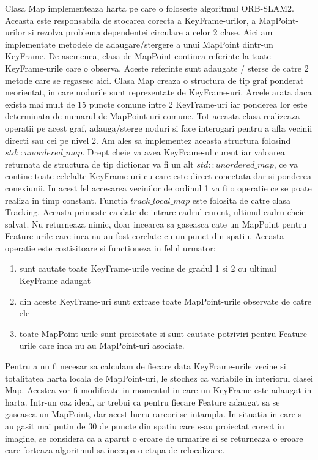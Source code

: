 \documentclass[12pt,a4paper]{report}
\begin{document}
Clasa Map implementeaza harta pe care o foloseste algoritmul ORB-SLAM2. Aceasta este responsabila
de stocarea corecta a KeyFrame-urilor, a MapPoint-urilor si rezolva problema dependentei circulare
a celor 2 clase. Aici am implementate metodele de adaugare/stergere a unui MapPoint dintr-un KeyFrame.
De asemenea, clasa de MapPoint continea referinte la toate KeyFrame-urile care o observa. Aceste 
referinte sunt adaugate / sterse de catre 2 metode care se regasesc aici. Clasa Map creaza o 
structura de tip graf ponderat neorientat, in care nodurile sunt reprezentate de KeyFrame-uri. 
Arcele arata daca exista mai mult de 15 puncte comune intre 2 KeyFrame-uri iar ponderea lor este 
determinata de numarul de MapPoint-uri comune. Tot aceasta clasa realizeaza operatii pe acest graf,
adauga/sterge noduri si face interogari pentru a afla vecinii directi sau cei pe nivel 2. Am ales 
sa implementez aceasta structura folosind $ std::unordered\_map $. Drept cheie va avea KeyFrame-ul 
curent iar valoarea returnata de structura de tip dictionar va fi un alt $ std::unordered\_map $, 
ce va contine toate celelalte KeyFrame-uri cu care este direct conectata dar si ponderea conexiunii.
In acest fel accesarea vecinilor de ordinul 1 va fi o operatie ce se poate realiza in timp constant.
Functia $ track\_local\_map $ este folosita de catre clasa Tracking. Aceasta primeste ca date 
de intrare cadrul curent, ultimul cadru cheie salvat. Nu returneaza nimic, doar incearca 
sa gaseasca cate un MapPoint pentru Feature-urile care inca nu au fost corelate cu un punct 
din spatiu. Aceasta operatie este costisitoare si functioneza in felul urmator:
\begin{enumerate}
    \item sunt cautate toate KeyFrame-urile vecine de gradul 1 si 2 cu ultimul KeyFrame adaugat
    \item din aceste KeyFrame-uri sunt extrase toate MapPoint-urile observate de catre ele 
    \item toate MapPoint-urile sunt proiectate si sunt cautate potriviri pentru Feature-urile
care inca nu au MapPoint-uri asociate.      
\end{enumerate}
Pentru a nu fi necesar sa calculam de fiecare data KeyFrame-urile vecine si totalitatea 
harta locala de MapPoint-uri, le stochez ca variabile in interiorul clasei Map. Acestea vor 
fi modificate in momentul in care un KeyFrame este adaugat in harta. Intr-un caz ideal, ar 
trebui ca pentru fiecare Feature adaugat sa se gaseasca un MapPoint, dar acest lucru rareori 
se intampla. In situatia in care s-au gasit mai putin de 30 de puncte din spatiu care s-au 
proiectat corect in imagine, se considera ca a aparut o eroare de urmarire si se returneaza 
o eroare care forteaza algoritmul sa inceapa o etapa de relocalizare. \\
\end{document}

